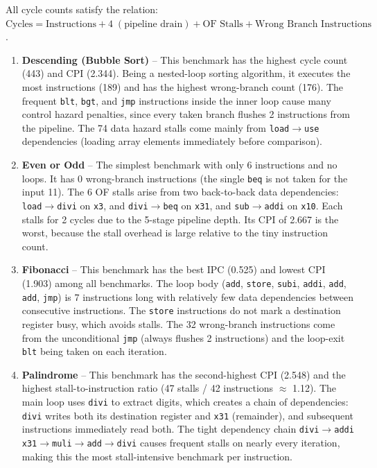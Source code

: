 \documentclass[12pt]{article}
\begin{document}
All cycle counts satisfy the relation: $\text{Cycles} = \text{Instructions} + 4\;(\text{pipeline drain}) + \text{OF Stalls} + \text{Wrong Branch Instructions}$.

\begin{enumerate}[leftmargin=*]

\item \textbf{Descending (Bubble Sort)} -- This benchmark has the highest cycle count (443) and CPI (2.344). Being a nested-loop sorting algorithm, it executes the most instructions (189) and has the highest wrong-branch count (176). The frequent \texttt{blt}, \texttt{bgt}, and \texttt{jmp} instructions inside the inner loop cause many control hazard penalties, since every taken branch flushes 2 instructions from the pipeline. The 74 data hazard stalls come mainly from \texttt{load}$\rightarrow$\texttt{use} dependencies (loading array elements immediately before comparison).

\item \textbf{Even or Odd} -- The simplest benchmark with only 6 instructions and no loops. It has 0 wrong-branch instructions (the single \texttt{beq} is not taken for the input 11). The 6 OF stalls arise from two back-to-back data dependencies: \texttt{load}$\rightarrow$\texttt{divi} on \texttt{x3}, and \texttt{divi}$\rightarrow$\texttt{beq} on \texttt{x31}, and \texttt{sub}$\rightarrow$\texttt{addi} on \texttt{x10}. Each stalls for 2 cycles due to the 5-stage pipeline depth. Its CPI of 2.667 is the worst, because the stall overhead is large relative to the tiny instruction count.

\item \textbf{Fibonacci} -- This benchmark has the best IPC (0.525) and lowest CPI (1.903) among all benchmarks. The loop body (\texttt{add}, \texttt{store}, \texttt{subi}, \texttt{addi}, \texttt{add}, \texttt{add}, \texttt{jmp}) is 7 instructions long with relatively few data dependencies between consecutive instructions. The \texttt{store} instructions do not mark a destination register busy, which avoids stalls. The 32 wrong-branch instructions come from the unconditional \texttt{jmp} (always flushes 2 instructions) and the loop-exit \texttt{blt} being taken on each iteration.

\item \textbf{Palindrome} -- This benchmark has the second-highest CPI (2.548) and the highest stall-to-instruction ratio (47 stalls / 42 instructions $\approx$ 1.12). The main loop uses \texttt{divi} to extract digits, which creates a chain of dependencies: \texttt{divi} writes both its destination register and \texttt{x31} (remainder), and subsequent instructions immediately read both. The tight dependency chain \texttt{divi}$\rightarrow$\texttt{addi x31}$\rightarrow$\texttt{muli}$\rightarrow$\texttt{add}$\rightarrow$\texttt{divi} causes frequent stalls on nearly every iteration, making this the most stall-intensive benchmark per instruction.


\end{enumerate}
\end{document}
